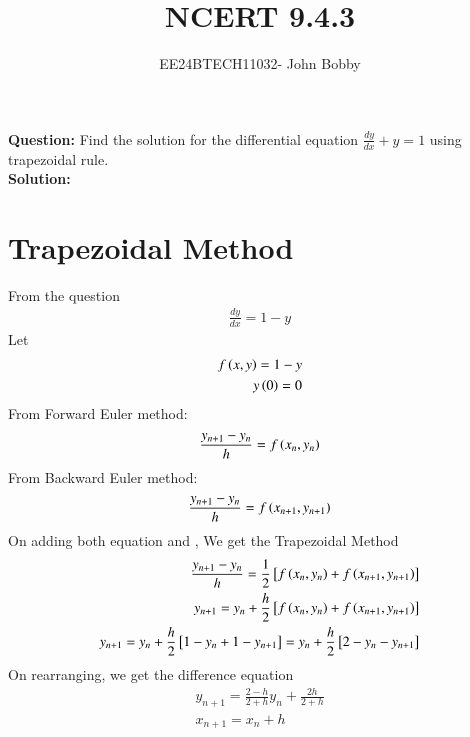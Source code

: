 \documentclass[journal,12pt,onecolumn]{IEEEtran}
\theoremstyle{remark}
\begin{document}

\vspace{3cm}

\title{\textbf{NCERT 9.4.3}}
\author{EE24BTECH11032- John Bobby}
\maketitle
\bigskip
\textbf{Question:} Find the solution for the differential equation $\frac{dy}{dx}+y=1$ using trapezoidal rule.\\
\textbf{Solution:}\\
\section{Trapezoidal Method }
From the question 
\begin{align}
    \frac{dy}{dx}=1-y
\end{align}
Let
\begin{align}
    f\left(x,y\right)=1-y\\
    y\left(0\right)=0
\end{align}
From Forward Euler method:
\begin{align}
\frac{y_{n+1}-y_{n}}{h}=f\left(x_{n},y_{n}\right)
\end{align}
From Backward Euler method:
\begin{align}
    \frac{y_{n+1}-y_{n}}{h}=f\left(x_{n+1},y_{n+1}\right)
\end{align}
On adding both equation  and , We get the Trapezoidal Method
\begin{align}
    \frac{y_{n+1}-y_{n}}{h}=\frac{1}{2}{}\left[f\left(x_n,y_n\right)+f\left(x_{n+1},y_{n+1}\right)\right]\\
    y_{n+1}=y_{n}+\frac{h}{2}{}\left[f\left(x_n,y_n\right)+f\left(x_{n+1},y_{n+1}\right)\right]\\
    y_{n+1}=y_n+\frac{h}{2}{}\left[1-y_n+1-y_{n+1}\right]=y_n+\frac{h}{2}{}\left[2-y_n-y_{n+1}\right]
\end{align}
On rearranging, we get the difference equation
\begin{align}
    y_{n+1}=\frac{2-h}{2+h}y_n+\frac{2h}{2+h}\\ 
    x_{n+1}=x_n +h
\end{align}
\end{document}
